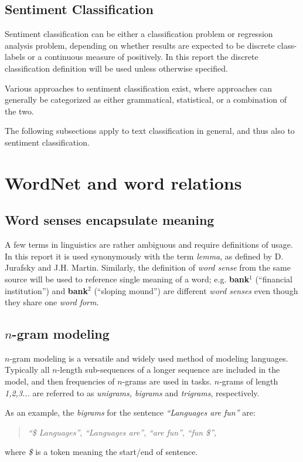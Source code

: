 \documentclass[a4paper,11pt]{kth-mag}
\newcommand{\ngram}{$n$-gram }
\newcommand{\ngrams}{$n$-grams }
\begin{document}
\subsection{Sentiment Classification}
Sentiment classification can be either a classification problem or regression analysis problem\cite{liu2012sentiment}, depending on whether results are expected to be discrete class-labels or a continuous measure of positively. In this report the discrete classification definition will be used unless otherwise specified.

Various approaches to sentiment classification exist, where approaches can generally be categorized as either grammatical\cite{todo}, statistical\cite{todo}, or a combination of the two.

The following subsections apply to text classification in general, and thus also to sentiment classification.

\section{WordNet and word relations}
\subsection{Word senses encapsulate meaning}
A few terms in linguistics are rather ambiguous and require definitions of usage. In this report it is used synonymously with the term \emph{lemma}, as defined by D. Jurafsky and J.H. Martin\cite{nlpbook}. Similarly, the definition of \emph{word sense} from the same source will be used to reference single meaning of a word; e.g. \textbf{bank$^1$} (``financial institution'') and \textbf{bank$^2$} (``sloping mound'') are different \emph{word senses} even though they share one \emph{word form}.

\subsection{\ngram modeling}
\ngram modeling is a versatile and widely used method of modeling languages. Typically all $n$-length sub-sequences of a longer sequence are included in the model, and then frequencies of \ngrams are used in tasks. $n$-grams of length \emph{1,2,3...} are referred to as \emph{unigrams, bigrams} and \emph{trigrams}, respectively.

As an example, the \emph{bigrams} for the sentence \emph{``Languages are fun''} are:
\begin{quote}
  \vspace*{0.1cm}
  \centering
\emph{``\$ Languages''}, \emph{``Languages are''}, \emph{``are fun''}, \emph{``fun \$''},
\end{quote}
where \emph{\$} is a token meaning the start/end of sentence.
\end{document}
